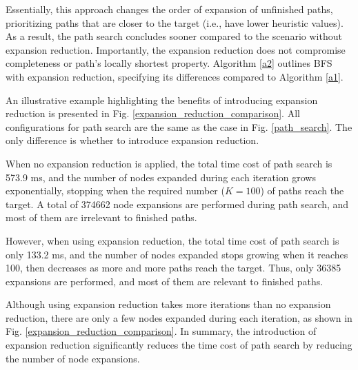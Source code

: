 \documentclass[letterpaper, 10 pt, journal, twoside]{IEEEtran}
\begin{document}


Essentially, this approach changes the order of expansion of unfinished paths, prioritizing paths that are closer to the target (i.e., have lower heuristic values). As a result, the path search concludes sooner compared to the scenario without expansion reduction. Importantly, the expansion reduction does not compromise completeness or path's locally shortest property. Algorithm \ref{a2} outlines BFS with expansion reduction, specifying its differences compared to Algorithm \ref{a1}.

An illustrative example highlighting the benefits of introducing expansion reduction is presented in Fig. \ref{expansion_reduction_comparison}. All configurations for path search are the same as the case in Fig. \ref{path_search}. The only difference is whether to introduce expansion reduction.

When no expansion reduction is applied, the total time cost of path search is 573.9 ms, and the number of nodes expanded during each iteration grows exponentially, stopping when the required number ($K=100$) of paths reach the target. A total of 374662 node expansions are performed during path search, and most of them are irrelevant to finished paths.

However, when using expansion reduction, the total time cost of path search is only 133.2 ms, and the number of nodes expanded stops growing when it reaches 100, then decreases as more and more paths reach the target. Thus, only 36385 expansions are performed, and most of them are relevant to finished paths.

Although using expansion reduction takes more iterations than no expansion reduction, there are only a few nodes expanded during each iteration, as shown in Fig. \ref{expansion_reduction_comparison}. In summary, the introduction of expansion reduction significantly reduces the time cost of path search by reducing the number of node expansions.
\end{document}
